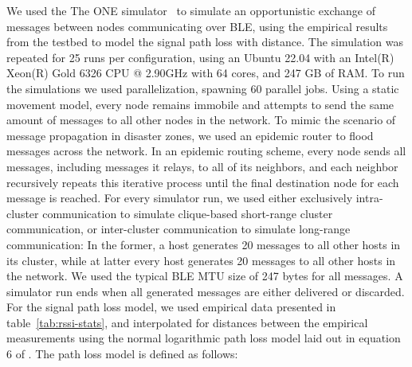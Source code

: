 We used the The ONE simulator~\cite{the-one} to simulate an opportunistic exchange of messages between nodes communicating over BLE, using the empirical results from the testbed to model the signal path loss with distance.
The simulation was repeated for 25 runs per configuration, using an Ubuntu 22.04 with an Intel(R) Xeon(R) Gold 6326 CPU @ 2.90GHz with 64 cores, and 247 GB of RAM. To run the simulations we used parallelization, spawning 60 parallel jobs.
Using a static movement model, every node remains immobile and attempts to send the same amount of messages to all other nodes in the network.
To mimic the scenario of message propagation in disaster zones, we used an epidemic router to flood messages across the network.
In an epidemic routing scheme, every node sends all messages, including messages it relays, to all of its neighbors, and each neighbor recursively repeats this iterative process until the final destination node for each message is reached.
For every simulator run, we used either exclusively intra-cluster communication to simulate clique-based short-range cluster communication, or inter-cluster communication to simulate long-range communication:
In the former, a host generates 20 messages to all other hosts in its cluster, while at latter every host generates 20 messages to all other hosts in the network.
We used the typical BLE MTU size of 247 bytes for all messages.
A simulator run ends when all generated messages are either delivered or discarded.
For the signal path loss model, we used empirical data presented in table~\ref{tab:rssi-stats}, and interpolated for distances between the empirical measurements using the normal logarithmic path loss model laid out in equation 6 of \cite{pathloss}.
The path loss model is defined as follows:

